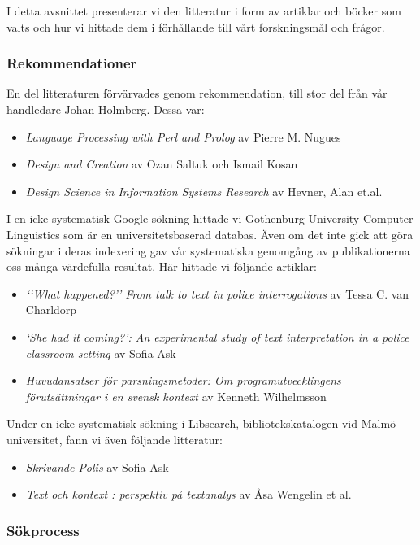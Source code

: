 \documentclass[swedish]{maucsthesis}
\begin{document}
I detta avsnittet presenterar vi den litteratur i form av artiklar och böcker
som valts och hur vi hittade dem i förhållande till vårt forskningsmål och
frågor.

\subsubsection{Rekommendationer}

En del litteraturen förvärvades genom rekommendation, till stor del från vår
handledare Johan Holmberg. Dessa var:
\begin{itemize}
\item \textit{Language Processing with Perl and Prolog} av Pierre M. Nugues
\item \textit{Design and Creation} av Ozan Saltuk och Ismail Kosan
\item \textit{Design Science in Information Systems Research} av Hevner, Alan et.al.
\end{itemize}

I en icke-systematisk Google-sökning hittade vi Gothenburg University Computer
Linguistics som är en universitetsbaserad databas. Även om det inte gick att
göra sökningar i deras indexering gav vår systematiska genomgång av
publikationerna oss många värdefulla resultat. Här hittade vi följande artiklar:

\begin{itemize}
\item \textit{‘‘What happened?’’ From talk to text in police interrogations} av
  Tessa C. van Charldorp
\item \textit{‘She had it coming?’: An experimental study of text interpretation
    in a police classroom setting} av Sofia Ask
\item \textit{Huvudansatser för parsningsmetoder: Om programutvecklingens
    förutsättningar i en svensk kontext} av Kenneth Wilhelmsson
\end{itemize}

Under en icke-systematisk sökning i Libsearch, bibliotekskatalogen vid Malmö
universitet, fann vi även följande litteratur:

\begin{itemize}
\item \textit{Skrivande Polis} av Sofia Ask
\item \textit{Text och kontext : perspektiv på textanalys} av Åsa Wengelin et al.
\end{itemize}

\subsubsection{Sökprocess}
\end{document}
